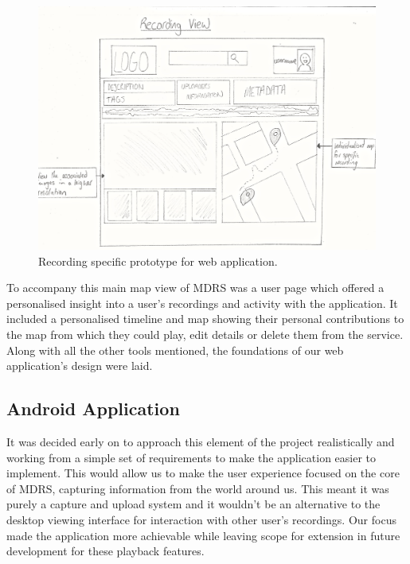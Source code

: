 \documentclass{l3proj}
\begin{document}
\begin{figure}[ht!]
\centering
\includegraphics[width=1\textwidth]{images/web-recording-view.jpg}
\caption{Recording specific prototype for web application.}
\end{figure}

To accompany this main map view of MDRS was a user page which offered a
personalised insight into a user's recordings and activity with the application.
It included a personalised timeline and map showing their personal contributions
to the map from which they could play, edit details or delete them from the
service. Along with all the other tools mentioned, the foundations of our
web application's design were laid.

\subsection{Android Application} It was decided early on to approach this
element of the project realistically and working from a simple set of requirements to
make the application easier to implement. This would allow us to make the user experience focused on the core of MDRS, capturing information from the world around us. This meant it was purely a capture and upload system and it wouldn't be an alternative to the desktop viewing interface for interaction with other user's recordings. Our focus made the application more achievable while leaving scope for extension in future development for these playback features.
\end{document}
